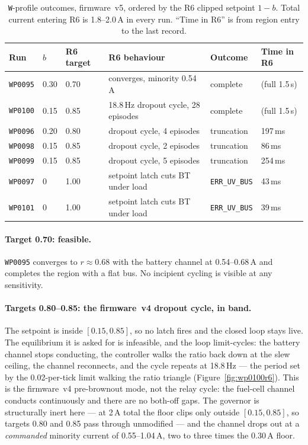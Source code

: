 \documentclass[11pt]{article}
\newcommand{\code}[1]{\texttt{#1}}
\begin{document}
\begin{table}[H]
\centering
\caption{\code{W}-profile outcomes, firmware~v5, ordered by the R6 clipped
setpoint $1-b$. Total current entering R6 is 1.8--2.0\,A in every run. ``Time
in R6'' is from region entry to the last record.}
\label{tab:v5w}
\begin{tabular}{llllll}
\toprule
Run & $b$ & R6 target & R6 behaviour & Outcome & Time in R6 \\
\midrule
\code{WP0095} & 0.30 & 0.70 & converges, minority 0.54\,A & complete & (full 1.5\,s) \\
\code{WP0100} & 0.15 & 0.85 & 18.8\,Hz dropout cycle, 28 episodes & complete & (full 1.5\,s) \\
\code{WP0096} & 0.20 & 0.80 & dropout cycle, 4 episodes & truncation & 197\,ms \\
\code{WP0098} & 0.15 & 0.85 & dropout cycle, 2 episodes & truncation & 86\,ms \\
\code{WP0099} & 0.15 & 0.85 & dropout cycle, 5 episodes & truncation & 254\,ms \\
\code{WP0097} & 0 & 1.00 & setpoint latch cuts BT under load & \code{ERR\_UV\_BUS} & 43\,ms \\
\code{WP0101} & 0 & 1.00 & setpoint latch cuts BT under load & \code{ERR\_UV\_BUS} & 39\,ms \\
\bottomrule
\end{tabular}
\end{table}

\paragraph{Target 0.70: feasible.} \code{WP0095} converges to $r\approx0.68$
with the battery channel at 0.54--0.68\,A and completes the region with a flat
bus. No incipient cycling is visible at any sensitivity.

\paragraph{Targets 0.80--0.85: the firmware~v4 dropout cycle, in band.} The
setpoint is inside $[0.15, 0.85]$, so no latch fires and the closed loop stays
live. The equilibrium it is asked for is infeasible, and the loop limit-cycles:
the battery channel stops conducting, the controller walks the ratio back down
at the slew ceiling, the channel reconnects, and the cycle repeats at 18.8\,Hz
--- the period set by the 0.02-per-tick limit walking the ratio triangle
(Figure~\ref{fig:wp0100r6}). This is the firmware~v4 pre-brownout mode, not the
relay cycle: the fuel-cell channel conducts continuously and there are no
both-off gaps. The governor is structurally inert here --- at 2\,A total the
floor clips only outside $[0.15, 0.85]$, so targets 0.80 and 0.85 pass through
unmodified --- and the channel drops out at a \emph{commanded} minority current
of 0.55--1.04\,A, two to three times the 0.30\,A floor.
\end{document}
